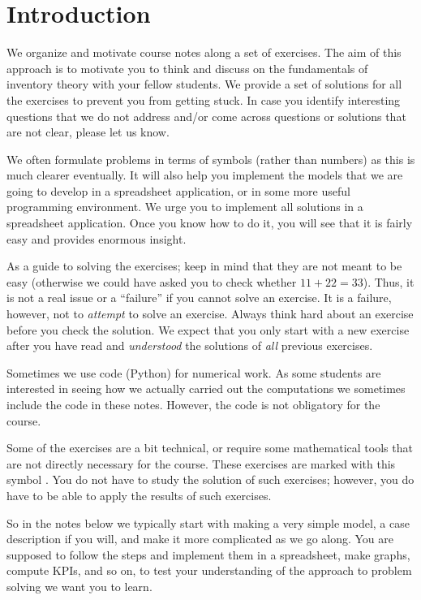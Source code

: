 \section{Introduction}
\label{sec:introduction}

We organize and motivate course notes along a set of exercises. The aim of this approach is to motivate you to think and discuss on the fundamentals of inventory theory with your fellow students. We provide a set of solutions for all the exercises to prevent you from getting stuck. In case you identify interesting questions that we do not address and/or come across questions or solutions that are not clear, please let us know. 

We often formulate problems in terms of symbols (rather than numbers) as this is much clearer eventually. It will also help you implement the models that we are going to develop in a spreadsheet application, or in some more useful programming environment. We urge you to implement all solutions in a spreadsheet application. Once you know how to do it, you will see that it is fairly easy and provides enormous insight.

As a guide to solving the exercises; keep in mind that they are not meant to be easy (otherwise we could have asked you to check whether $11+22=33$). Thus, it is not a real issue or a ``failure'' if you cannot solve an exercise. It is a failure, however, not to \emph{attempt} to solve an exercise. Always think hard about an exercise before you check the solution. We expect that  you only start with a new exercise after you have read and \emph{understood} the solutions of \emph{all} previous exercises. 

Sometimes we use code (Python) for numerical work. As some students
are interested in seeing how we actually carried out the computations
we sometimes include the code in these notes. However, the code is not
obligatory for the course.

Some of the exercises are a bit technical, or require some mathematical tools that are not directly necessary for the course. These exercises are marked with this symbol \faRocket. You do not have to study the solution of such exercises; however, you do have to be able to apply the results of such exercises.

So in the notes below we typically start with making a very simple model, a case description if you
will, and make it more complicated as we go along.  You are supposed
to follow the steps and implement them in a spreadsheet, make graphs, compute
KPIs, and so on, to test your understanding of the approach to problem
solving we want you to learn.

\clearpage
